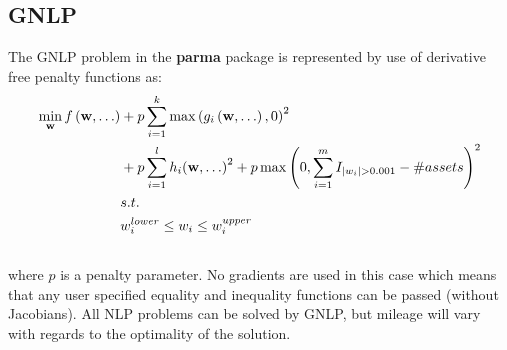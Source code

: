 \subsection{GNLP}
The GNLP problem in the \textbf{parma} package is represented by use of
derivative free penalty functions as:
\begin{align}
\mathop{\min }\limits_{\mathbf{w}}f\left( {{\mathbf{w}},\dots} \right) & +
{p}\sum\limits_{i=1}^k {\max {{\left( {{g_i}\left( {{\mathbf{w}},\dots}
\right),0} \right)}^2}}\\ \nonumber
& + {p}\sum\limits_{i=1}^l {{h_i}{{\left( {{\mathbf{w}}, \ldots } \right)}^2}}
+ {p}\max {\left( {0,\sum\limits_{i=1}^m {{I_{\left| {{w_i}} \right| > 0.001}} - \# assets} } \right)^2}\\
&s.t.\hfill \\ \nonumber
&w_i^{lower} \leq {w_i} \leq w_i^{upper}\\ \nonumber
\end{align}
where $p$ is a penalty parameter. No gradients are used in this case which means that
any user specified equality and inequality functions can be passed (without Jacobians).
All NLP problems can be solved by GNLP, but mileage will vary with regards to the optimality
of the solution.

